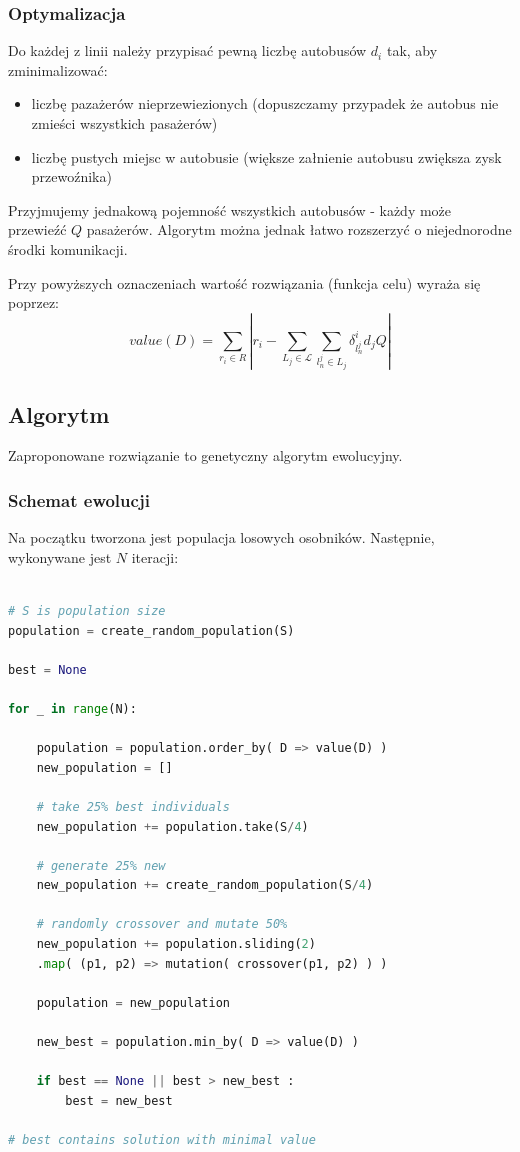 \documentclass[polish,12pt]{aghthesis}
\begin{document}
\subsubsection{Optymalizacja}
Do każdej z linii należy przypisać pewną liczbę autobusów $d_i$ tak, aby zminimalizować:
\begin{itemize}
	\item liczbę pazażerów nieprzewiezionych (dopuszczamy przypadek że autobus nie zmieści wszystkich pasażerów)
	\item liczbę pustych miejsc w autobusie (większe załnienie autobusu zwiększa zysk przewoźnika)
\end{itemize}

Przyjmujemy jednakową pojemność wszystkich autobusów - każdy może przewieźć $Q$ pasażerów. Algorytm można jednak łatwo rozszerzyć o niejednorodne środki komunikacji.

Przy powyższych oznaczeniach wartość rozwiązania (funkcja celu) wyraża się poprzez:
\begin{equation}
value(D) = \sum_{r_i \in R}|
	r_i - \sum_{L_j \in \mathcal{L}}\sum_{l_n^j \in L_j} \delta_{l_n^j}^i d_j Q
| 
\end{equation}

\subsection{Algorytm}
Zaproponowane rozwiązanie to genetyczny algorytm ewolucyjny.

\subsubsection{Schemat ewolucji}
Na początku tworzona jest populacja losowych osobników. Następnie, wykonywane jest $N$ iteracji:

\begin{lstlisting}[language=Python]

# S is population size
population = create_random_population(S)

best = None

for _ in range(N):

	population = population.order_by( D => value(D) )
	new_population = []
	
	# take 25% best individuals
	new_population += population.take(S/4)
	
	# generate 25% new
	new_population += create_random_population(S/4)
	
	# randomly crossover and mutate 50%
	new_population += population.sliding(2)
	.map( (p1, p2) => mutation( crossover(p1, p2) ) )
	
	population = new_population
	
	new_best = population.min_by( D => value(D) )
	
	if best == None || best > new_best :
		best = new_best
		
# best contains solution with minimal value
\end{lstlisting}
\end{document}
